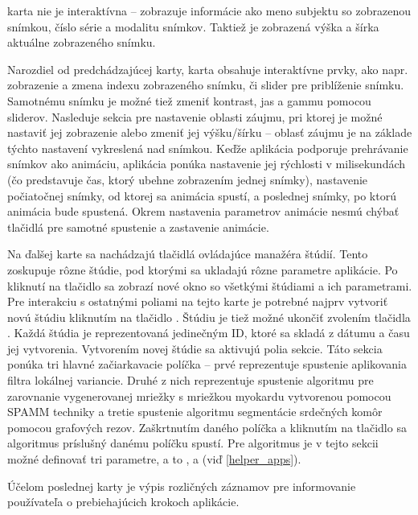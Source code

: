 { karta nie je interaktívna -- zobrazuje informácie ako meno subjektu so zobrazenou snímkou, číslo série a modalitu snímkov. Taktiež je zobrazená výška a šírka aktuálne zobrazeného snímku.

Narozdiel od predchádzajúcej karty,  karta obsahuje interaktívne prvky, ako napr. zobrazenie a zmena indexu zobrazeného snímku, či slider pre priblíženie snímku. Samotnému snímku je možné tiež zmeniť kontrast, jas a gammu pomocou sliderov. Nasleduje sekcia pre nastavenie  oblasti záujmu, pri ktorej je možné nastaviť jej zobrazenie alebo zmeniť jej výšku/šírku -- oblasť záujmu je na základe týchto nastavení vykreslená nad snímkou. Keďže aplikácia podporuje prehrávanie snímkov ako animáciu, aplikácia ponúka nastavenie jej rýchlosti v milisekundách (čo predstavuje čas, ktorý ubehne zobrazením jednej snímky), nastavenie počiatočnej snímky, od ktorej sa animácia spustí, a poslednej snímky, po ktorú animácia bude spustená. Okrem nastavenia parametrov animácie nesmú chýbať tlačidlá pre samotné spustenie a zastavenie animácie.

Na ďalšej karte  sa nachádzajú tlačidlá ovládajúce manažéra štúdií. Tento  zoskupuje rôzne štúdie, pod ktorými sa ukladajú rôzne parametre aplikácie. Po kliknutí na tlačidlo  sa zobrazí nové okno so všetkými štúdiami a ich parametrami.
Pre interakciu s ostatnými poliami na tejto karte je potrebné najprv vytvoriť novú štúdiu kliknutím na tlačidlo . \newline Štúdiu je tiež možné ukončiť zvolením tlačidla . Každá štúdia je reprezentovaná jedinečným ID, ktoré sa skladá z dátumu a času jej vytvorenia.
Vytvorením novej štúdie sa aktivujú polia  sekcie. Táto sekcia ponúka tri hlavné začiarkavacie políčka -- prvé reprezentuje spustenie aplikovania filtra lokálnej variancie. Druhé z nich reprezentuje spustenie algoritmu pre zarovnanie vygenerovanej mriežky s mriežkou myokardu vytvorenou pomocou SPAMM techniky a tretie spustenie algoritmu segmentácie srdečných komôr pomocou grafových rezov. Zaškrtnutím daného políčka a kliknutím na tlačidlo  sa algoritmus príslušný danému políčku spustí. Pre  algoritmus je v tejto sekcii možné definovať tri parametre, a to ,  a  (viď \ref{helper_apps}).

Účelom poslednej karty  je výpis rozličných záznamov pre informovanie používateľa o prebiehajúcich krokoch aplikácie. \newline

}
